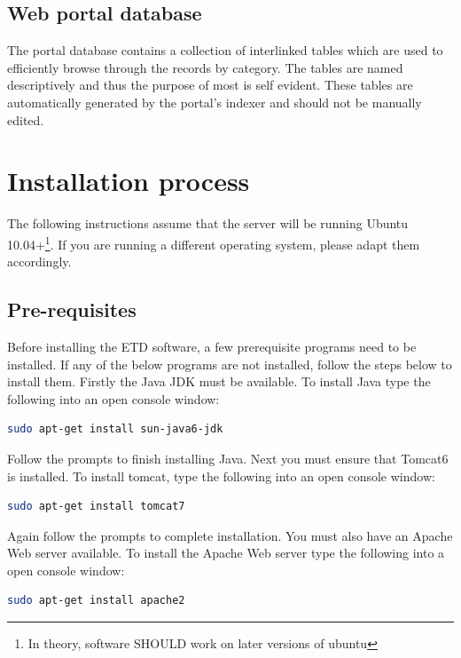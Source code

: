 \documentclass[a4paper,11pt]{article}
\begin{document}
\subsection{Web portal database}

The portal database contains a collection of interlinked tables which are used to efficiently browse through the records by category. The tables are named descriptively and thus the purpose of most is self evident. These tables are automatically generated by the portal's indexer and should not be manually edited.

\section{Installation process}

The following instructions assume that the server will be running Ubuntu 10.04+\footnote{In theory, software SHOULD work on later versions of ubuntu}. If you are running a different operating system, please adapt them accordingly.

\subsection{Pre-requisites}

Before installing the ETD software, a few prerequisite programs need to be installed. If any of the below programs are not installed, follow the steps below to install them. Firstly the Java JDK must be available. To install Java type the following into an open console window: 

\begin{lstlisting}[language=bash]
 sudo apt-get install sun-java6-jdk
\end{lstlisting}


Follow the prompts to finish installing Java. Next you must ensure that Tomcat6 is installed. To install tomcat, type the following into an open console window: 

\begin{lstlisting}[language=bash]
 sudo apt-get install tomcat7
\end{lstlisting}


Again follow the prompts to complete installation. You must also have an Apache Web server available. To install the Apache Web server type the following into a open console window: 

\begin{lstlisting}[language=bash]
 sudo apt-get install apache2
\end{lstlisting}
\end{document}
